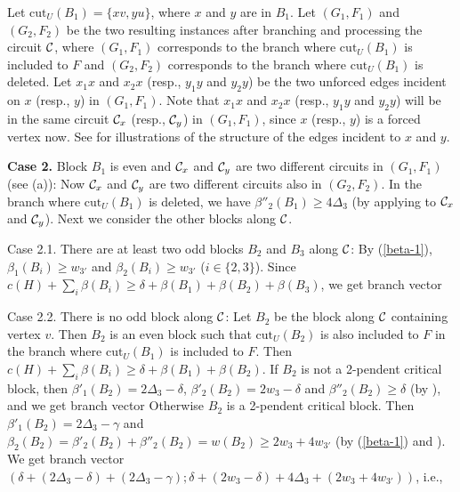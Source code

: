 \documentclass[runningheads]{llncs}
\begin{document}
 Let  $\mathrm{cut}_U(B_1)=\{xv,yu\}$,
where $x$ and $y$ are in $B_1$. Let $(G_1, F_1)$ and $(G_2,F_2)$ be the two resulting instances after branching and processing the circuit ${\cal C}$, where $(G_1, F_1)$ corresponds to the branch where $\mathrm{cut}_U(B_1)$ is included to $F$ and $(G_2, F_2)$ corresponds to the branch where $\mathrm{cut}_U(B_1)$ is deleted. Let $x_1x$ and $x_2x$ (resp., $y_1y$ and $y_2y$) be the two unforced edges incident on $x$ (resp., $y$) in $(G_1,F_1)$. Note that $x_1x$ and $x_2x$ (resp., $y_1y$ and $y_2y$) will be in the same circuit ${\cal C}_x$ (resp., ${\cal C}_y$) in $(G_1,F_1)$, since $x$ (resp., $y$) is a forced vertex now.
See  for illustrations of the structure of the edges incident to $x$ and $y$.
\vspace{-0mm}\vspace{-0mm}


{\bf Case 2.} Block $B_1$ is even and ${\cal C}_x$ and ${\cal C}_y$ are two different circuits in $(G_1,F_1)$
(see (a)):
Now ${\cal C}_x$ and ${\cal C}_y$ are two different circuits also  in $(G_2,F_2)$.
In the branch where $\mathrm{cut}_U(B_1)$ is deleted, we have
$\beta''_2(B_1)\geq 4\Delta_3$  (by applying  to ${\cal C}_x$ and ${\cal C}_y$).
Next we consider the other blocks along ${\cal C}$.

Case 2.1. There are at least two odd blocks $B_2$ and $B_3$ along ${\cal C}$:
By (\ref{beta-1}), $\beta_1(B_i)\geq w_{3'}$ and $\beta_2(B_i)\geq w_{3'}$ ($i\in\{2,3\}$).
Since $c(H)+\sum_i \beta(B_i)\geq \delta+ \beta(B_1)+\beta(B_2)+\beta(B_3)$, we get branch vector

Case 2.2. There is no odd block along ${\cal C}$:
 Let $B_2$ be the block along ${\cal C}$ containing vertex $v$.
Then $B_2$ is an even block
such that $\mathrm{cut}_U(B_2)$ is also included to $F$ in the branch
 where $\mathrm{cut}_U(B_1)$ is included to $F$.
Then $c(H)+\sum_i \beta(B_i)\geq \delta+ \beta(B_1)+\beta(B_2)$.
If $B_2$ is not a 2-pendent critical block, then $\beta'_1(B_2)= 2\Delta_3-\delta$, $\beta'_2(B_2)=2w_3-\delta$ and $\beta''_2(B_2)\geq \delta$ (by ), and we get branch vector
Otherwise $B_2$ is a 2-pendent critical block. Then $\beta'_1(B_2)= 2\Delta_3-\gamma$
and $\beta_2(B_2)=\beta'_2(B_2)+\beta''_2(B_2)=w(B_2)\geq 2w_3+4w_{3'}$ (by (\ref{beta-1}) and ).
We get branch vector
$(\delta+(2\Delta_3-\delta)+(2\Delta_3-\gamma); \delta+ (2w_3-\delta)+ 4\Delta_3+(2w_3+4w_{3'}))$, i.e.,
\end{document}
